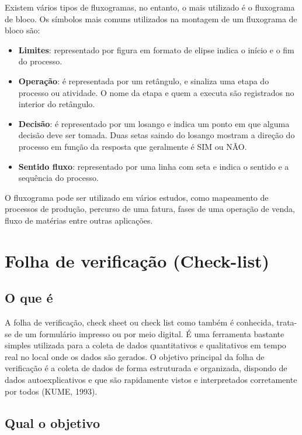 \documentclass[
]{article}
\begin{document}
Existem vários tipos de fluxogramas, no entanto, o mais utilizado é o fluxograma de bloco. Os símbolos mais comuns utilizados na montagem de um fluxograma de bloco são:

\begin{itemize}
\item
  \textbf{Limites}: representado por figura em formato de elipse indica o início e o fim do processo.
\item
  \textbf{Operação}: é representada por um retângulo, e sinaliza uma etapa do processo ou atividade. O nome da etapa e quem a executa são registrados no interior do retângulo.
\item
  \textbf{Decisão}: é representado por um losango e indica um ponto em que alguma decisão deve ser tomada. Duas setas saindo do losango mostram a direção do processo em função da resposta que geralmente é SIM ou NÃO.
\item
  \textbf{Sentido fluxo}: representado por uma linha com seta e indica o sentido e a sequência do processo.
\end{itemize}

O fluxograma pode ser utilizado em vários estudos, como mapeamento de processos de produção, percurso de uma fatura, fases de uma operação de venda, fluxo de matérias entre outras aplicações.

\hypertarget{folha-de-verificauxe7uxe3o-check-list}{%
\section{Folha de verificação (Check-list)}\label{folha-de-verificauxe7uxe3o-check-list}}

\hypertarget{o-que-uxe9-1}{%
\subsection*{O que é}\label{o-que-uxe9-1}}

A folha de verificação, check sheet ou check list como também é conhecida, trata-se de um formulário impresso ou por meio digital. É uma ferramenta bastante simples utilizada para a coleta de dados quantitativos e qualitativos em tempo real no local onde os dados são gerados. O objetivo principal da folha de verificação é a coleta de dados de forma estruturada e organizada, dispondo de dados autoexplicativos e que são rapidamente vistos e interpretados corretamente por todos (KUME, 1993).

\hypertarget{qual-o-objetivo-1}{%
\subsection*{Qual o objetivo}\label{qual-o-objetivo-1}}
\end{document}
